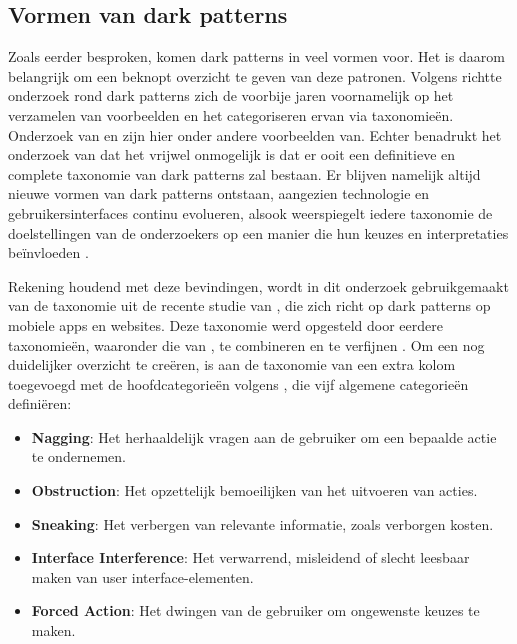 \vspace{0.5em}

\subsection{Vormen van dark patterns}
\label{subsec:vormen}

\vspace{1em}

Zoals eerder besproken, komen dark patterns in veel vormen voor. Het is daarom belangrijk om een beknopt overzicht te geven van deze patronen. Volgens \autocite{OECD2022} richtte onderzoek rond dark patterns zich de voorbije jaren voornamelijk op het verzamelen van voorbeelden en het categoriseren ervan via taxonomieën. Onderzoek van \textcite{Gray2018} en \textcite{DiGeronimo2020} zijn hier onder andere voorbeelden van. Echter benadrukt het onderzoek van \textcite{OECD2022} dat het vrijwel onmogelijk is dat er ooit een definitieve en complete taxonomie van dark patterns zal bestaan. Er blijven namelijk altijd nieuwe vormen van dark patterns ontstaan, aangezien technologie en gebruikersinterfaces continu evolueren, alsook weerspiegelt iedere taxonomie de doelstellingen van de onderzoekers op een manier die hun keuzes en interpretaties beïnvloeden \autocite{OECD2022}.

\vspace{1em}

Rekening houdend met deze bevindingen, wordt in dit onderzoek gebruikgemaakt van de taxonomie uit de recente studie van \textcite{Shi2025}, die zich richt op dark patterns op mobiele apps en websites. Deze taxonomie werd opgesteld door eerdere taxonomieën, waaronder die van \textcite{DiGeronimo2020}, te combineren en te verfijnen \autocite{Shi2025}. Om een nog duidelijker overzicht te creëren, is aan de taxonomie van \textcite{Shi2025} een extra kolom toegevoegd met de hoofdcategorieën volgens \textcite{DiGeronimo2020}, die vijf algemene categorieën definiëren: 

\begin{itemize}
    \item \textbf{Nagging}: Het herhaaldelijk vragen aan de gebruiker om een bepaalde actie te ondernemen.
    \item \textbf{Obstruction}: Het opzettelijk bemoeilijken van het uitvoeren van acties.
    \item \textbf{Sneaking}: Het verbergen van relevante informatie, zoals verborgen kosten.
    \item \textbf{Interface Interference}: Het verwarrend, misleidend of slecht leesbaar maken van user interface-elementen.
    \item \textbf{Forced Action}: Het dwingen van de gebruiker om ongewenste keuzes te maken.
\end{itemize}

